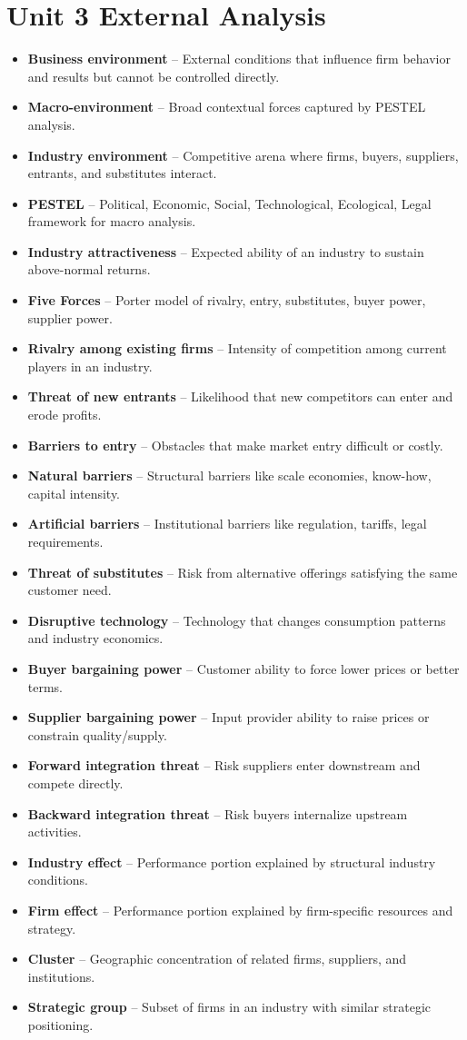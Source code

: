 \documentclass[10pt,a4paper]{article}
\newcommand{\vocab}[2]{\item \textbf{\textcolor{pinkmain}{#1}} -- #2}
\begin{document}
\section*{Unit 3 External Analysis}
\begin{itemize}
\vocab{Business environment}{External conditions that influence firm behavior and results but cannot be controlled directly.}
\vocab{Macro-environment}{Broad contextual forces captured by PESTEL analysis.}
\vocab{Industry environment}{Competitive arena where firms, buyers, suppliers, entrants, and substitutes interact.}
\vocab{PESTEL}{Political, Economic, Social, Technological, Ecological, Legal framework for macro analysis.}
\vocab{Industry attractiveness}{Expected ability of an industry to sustain above-normal returns.}
\vocab{Five Forces}{Porter model of rivalry, entry, substitutes, buyer power, supplier power.}
\vocab{Rivalry among existing firms}{Intensity of competition among current players in an industry.}
\vocab{Threat of new entrants}{Likelihood that new competitors can enter and erode profits.}
\vocab{Barriers to entry}{Obstacles that make market entry difficult or costly.}
\vocab{Natural barriers}{Structural barriers like scale economies, know-how, capital intensity.}
\vocab{Artificial barriers}{Institutional barriers like regulation, tariffs, legal requirements.}
\vocab{Threat of substitutes}{Risk from alternative offerings satisfying the same customer need.}
\vocab{Disruptive technology}{Technology that changes consumption patterns and industry economics.}
\vocab{Buyer bargaining power}{Customer ability to force lower prices or better terms.}
\vocab{Supplier bargaining power}{Input provider ability to raise prices or constrain quality/supply.}
\vocab{Forward integration threat}{Risk suppliers enter downstream and compete directly.}
\vocab{Backward integration threat}{Risk buyers internalize upstream activities.}
\vocab{Industry effect}{Performance portion explained by structural industry conditions.}
\vocab{Firm effect}{Performance portion explained by firm-specific resources and strategy.}
\vocab{Cluster}{Geographic concentration of related firms, suppliers, and institutions.}
\vocab{Strategic group}{Subset of firms in an industry with similar strategic positioning.}
\end{itemize}
\end{document}
